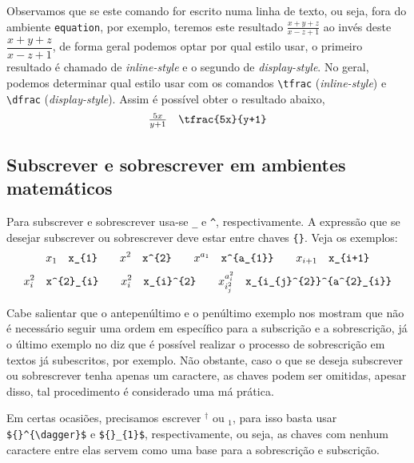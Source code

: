 \noindent Observamos que se este comando for escrito numa linha de texto, ou seja, fora do ambiente \verb|equation|, por exemplo, teremos este resultado $\frac{x+y+z}{x-z+1}$ ao inv\'{e}s deste $\dfrac{x+y+z}{x-z+1}$, de forma geral podemos optar por qual estilo usar, o primeiro resultado \'{e} chamado de \textit{inline-style} e o segundo de \textit{display-style}. No geral, podemos determinar qual estilo usar com os comandos \verb|\tfrac| (\textit{inline-style}) e \verb|\dfrac| (\textit{display-style}). Assim \'{e} poss\'{i}vel obter o resultado abaixo,
\begin{equation*}
    \tfrac{5x}{y+1} \quad \verb|\tfrac{5x}{y+1}|
\end{equation*}

\subsection{Subscrever e sobrescrever em ambientes matem\'{a}ticos}

Para subscrever e sobrescrever usa-se \verb|_| e \verb|^|, respectivamente. A express\~{a}o que se desejar subscrever ou sobrescrever deve estar entre chaves \verb|{}|. Veja os exemplos:
\begin{equation*}
    x_{1} \quad \verb|x_{1}| \qquad x^{2} \quad \verb|x^{2}| \qquad x^{a_{1}} \quad \verb|x^{a_{1}}| \qquad x_{i+1} \quad \verb|x_{i+1}|
\end{equation*}
\begin{equation*}
    x^{2}_{i} \quad \verb|x^{2}_{i}| \qquad x_{i}^{2} \quad \verb|x_{i}^{2}| \qquad x_{i_{j}^{2}}^{a^{2}_{i}} \quad \verb|x_{i_{j}^{2}}^{a^{2}_{i}}|
\end{equation*}

\noindent Cabe salientar que o antepenúltimo e o penúltimo exemplo nos mostram que n\~{a}o \'{e} necess\'{a}rio seguir uma ordem em espec\'{i}fico para a subscriç\~{a}o e a sobrescriç\~{a}o, j\'{a} o último exemplo no diz que \'{e} poss\'{i}vel realizar o processo de sobrescriç\~{a}o em textos j\'{a} subescritos, por exemplo. N\~{a}o obstante, caso o que se deseja subscrever ou sobrescrever tenha apenas um caractere, as chaves podem ser omitidas, apesar disso, tal procedimento \'{e} considerado uma m\'{a} pr\'{a}tica.

\noindent Em certas ocasi\~{o}es, precisamos escrever ${}^\dagger$ ou ${}_1$, para isso basta usar \verb|${}^{\dagger}$| e \verb|${}_{1}$|, respectivamente, ou seja, as chaves com nenhum caractere entre elas servem como uma base para a sobrescriç\~{a}o e subscriç\~{a}o.

